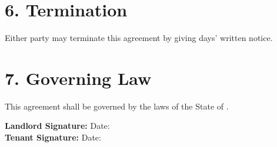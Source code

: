 \documentclass[12pt]{article}
\begin{document}
\section*{6. Termination}
Either party may terminate this agreement by giving \underline{\hspace{3cm}} days’ written notice.

\section*{7. Governing Law}
This agreement shall be governed by the laws of the State of \underline{\hspace{5cm}}.

\vspace{2cm}

\noindent
\textbf{Landlord Signature:} \underline{\hspace{7cm}} \hfill Date: \underline{\hspace{2.5cm}}\\[1cm]
\textbf{Tenant Signature:} \underline{\hspace{7cm}} \hfill Date: \underline{\hspace{2.5cm}}
\end{document}
